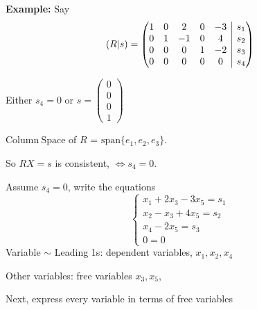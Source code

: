 \documentclass[12pt]{article}
\theoremstyle{plain}
\newcommand{\Span}{\mathrm{span}}
\newcommand{\ColSpace}{\mathrm{Column \ Space}}
\newcommand{\rvline}{\hspace*{-\arraycolsep}\vline\hspace*{-\arraycolsep}}
\begin{document}
{\color{Brown}
	\textbf{Example: }
	Say 
	\[
		(R|s) = 
		\begin{pmatrix}
			1 & 0 & 2 & 0 & -3 & \rvline & s_1	\\
			0 & 1 & -1 & 0 & 4 & \rvline & s_2	\\
			0 & 0 & 0 & 1 & -2 & \rvline & s_3	\\
			0 & 0 & 0 & 0 & 0  & \rvline & s_4	
		\end{pmatrix}
	\]

	Either $s_4 = 0$ or $s = \begin{pmatrix}0 \\ 0 \\ 0 \\ 1 \end{pmatrix}$

	$\ColSpace$ of $R$ = $\Span\{e_1, e_2, e_3\}$. 

	So $RX = s$ is consistent, $\Leftrightarrow s_4 = 0$. 

	Assume $s_4 = 0$, write the equations 
	\[
		\begin{cases}
			x_1 + 2x_3 - 3x_5 = s_1 \\
			x_2 - x_3 + 4x_5 = s_2	\\
			x_4 - 2x_5 = s_3	\\
			0 = 0
		\end{cases}
	\]
	Variable $\sim$ Leading 1s: dependent variables, $x_1, x_2, x_4$

	Other variables: free variables $x_3, x_5$, 

	Next, express every variable in terms of free variables 

}
\end{document}
